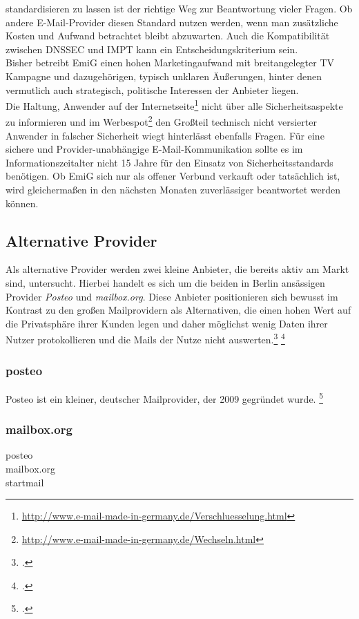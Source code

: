 \documentclass  [paper=a4,
				fontsize=12pt,
				listof=totoc,
				bibliography=totoc
				]{scrreprt}
\begin{document}
			standardisieren zu lassen ist der richtige Weg zur Beantwortung vieler Fragen.
			Ob andere E-Mail-Provider diesen Standard nutzen werden, wenn man zusätzliche Kosten und Aufwand betrachtet bleibt abzuwarten. Auch die Kompatibilität zwischen DNSSEC und IMPT kann ein Entscheidungskriterium sein.
			\medskip\\
			Bisher betreibt EmiG einen hohen Marketingaufwand mit breitangelegter TV Kampagne und dazugehörigen, typisch unklaren Äußerungen, hinter denen vermutlich auch strategisch, politische Interessen der Anbieter liegen.\\
			Die Haltung, Anwender auf der Internetseite\footnote{\url{http://www.e-mail-made-in-germany.de/Verschluesselung.html}} 
			nicht über alle Sicherheitsaspekte zu informieren und im Werbespot\footnote{\url{http://www.e-mail-made-in-germany.de/Wechseln.html}} den Großteil technisch nicht versierter Anwender in falscher Sicherheit wiegt hinterlässt ebenfalls Fragen.
			Für eine sichere und Provider-unabhängige E-Mail-Kommunikation sollte es im Informationszeitalter nicht 15 Jahre für den Einsatz von Sicherheitsstandards benötigen.
			Ob EmiG sich nur als offener Verbund verkauft oder tatsächlich ist, wird gleichermaßen in den nächsten Monaten zuverlässiger beantwortet werden können.

			\subsection{Alternative Provider}
			Als alternative Provider werden zwei kleine Anbieter, die bereits aktiv am Markt sind, untersucht.
			Hierbei handelt es sich um die beiden in Berlin ansässigen Provider \textit{Posteo} und \textit{mailbox.org}.
			Diese Anbieter positionieren sich bewusst im Kontrast zu den großen Mailprovidern als Alternativen, die einen hohen Wert auf die Privatsphäre ihrer Kunden legen und daher möglichst wenig Daten ihrer Nutzer protokollieren und die Mails der Nutze nicht auswerten.\footcite[Vgl.]{Posteo2013a} \footcite[Vgl.]{Mailborx2014}
			
			\subsubsection{posteo}
			\label{subsubsec:posteo}
				Posteo ist ein kleiner, deutscher Mailprovider, der 2009 gegründet wurde. \footcite[Vgl.]{Posteo2013b}
				
			\subsubsection{mailbox.org}
			\label{subsubsec:mailbox}
				posteo\\
				mailbox.org\\
				startmail
\end{document}
